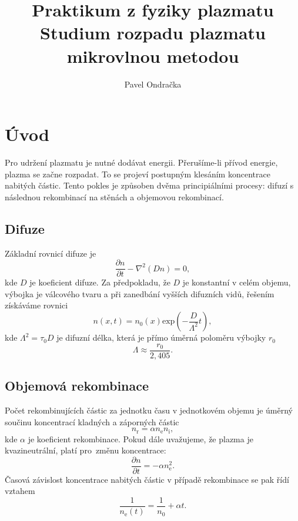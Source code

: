\documentclass[12pt]{article}
\begin{document}
\title{Praktikum z fyziky plazmatu \\
Studium rozpadu plazmatu mikrovlnou metodou}
\author{Pavel Ondračka}
\maketitle

\section{Úvod}
Pro udržení plazmatu je nutné dodávat energii. Přerušíme-li přívod energie, plazma se začne rozpadat. To se projeví postupným klesáním koncentrace nabitých částic. Tento pokles je způsoben dvěma principiálními procesy: difuzí s následnou rekombinací na stěnách a objemovou rekombinací.
\subsection{Difuze}
Základní rovnicí difuze je 
\begin{equation}
\frac{\partial n}{\partial t} - \nabla^2 (Dn) = 0 \mathrm{,}
\end{equation}
kde $D$ je koeficient difuze. Za předpokladu, že $D$ je konstantní v celém objemu, výbojka je válcového tvaru a při zanedbání vyšších difuzních vidů, řešením získáváme rovnici
\begin{equation}
n(x,t) = n_0(x) \mathrm{exp}(-\frac{D}{\Lambda^2}t) \mathrm{,}
\end{equation}
kde $\Lambda^2 = \tau_0 D$ je difuzní délka, která je přímo úměrná poloměru výbojky $r_0$
\begin{equation}\Lambda \approx 
\frac{r_0}{2,405} \mathrm{.}\end{equation}

\subsection{Objemová rekombinace}
Počet rekombinujících částic za jednotku času v jednotkovém objemu je úměrný součinu koncentrací kladných a záporných částic
\begin{equation}
n_\mathrm{r} = \alpha n_\mathrm{e} n_\mathrm{i} \mathrm{,}
\end{equation}
kde $\alpha$ je koeficient rekombinace. Pokud dále uvažujeme, že plazma je kvazineutrální, platí pro~změnu koncentrace:
\begin{equation}
\frac{\partial n}{\partial t} = -\alpha n_\mathrm{e}^2 \mathrm{.}
\end{equation}
Časová závislost koncentrace nabitých částic v případě rekombinace se pak řídí vztahem 
\begin{equation}
\frac{1}{n_\mathrm{e}(t)} = \frac{1}{n_0} + \alpha t \mathrm{.}
\end{equation}
\end{document}

